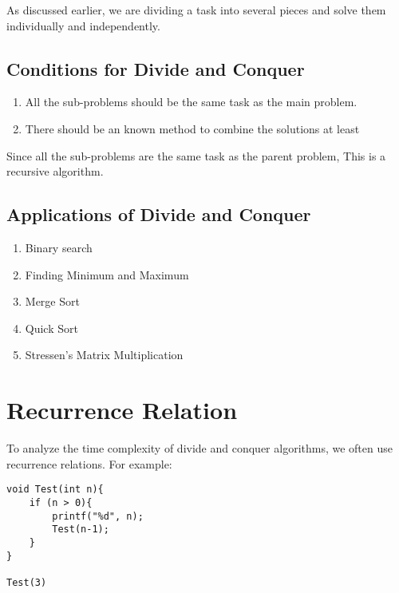 \documentclass[]{article}
\theoremstyle{plain}
\theoremstyle{definition}
\begin{document}
As discussed earlier, we are dividing a task into several pieces and solve them individually and independently. 

\subsection{Conditions for Divide and Conquer}
\begin{enumerate}
    \item All the sub-problems should be the same task as the main problem.
    \item There should be an known method to combine the solutions at least
\end{enumerate}

Since all the sub-problems are the same task as the parent problem, This is a recursive algorithm. 

\subsection{Applications of Divide and Conquer}
\begin{enumerate}
    \item Binary search
    \item Finding Minimum and Maximum
    \item Merge Sort
    \item Quick Sort
    \item Stressen's Matrix Multiplication
\end{enumerate}

\section{Recurrence Relation}
To analyze the time complexity of divide and conquer algorithms, we often use recurrence relations. For example:

\begin{verbatim}
void Test(int n){
    if (n > 0){
        printf("%d", n);
        Test(n-1);
    }
}

Test(3)
\end{verbatim}


\begin{center}
\end{center}
\end{document}
